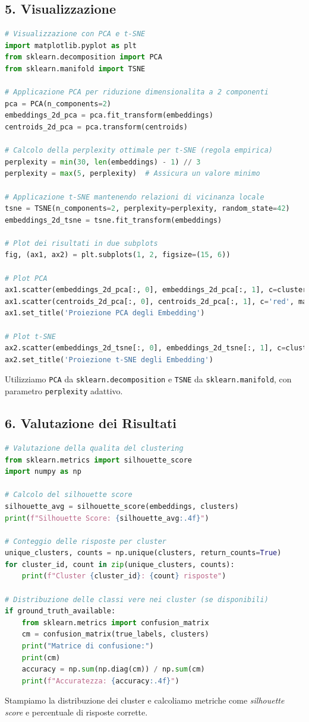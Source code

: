 \documentclass[a4paper,11pt]{article}
\begin{document}
\subsection*{5. Visualizzazione}
\begin{lstlisting}[language=Python]
# Visualizzazione con PCA e t-SNE
import matplotlib.pyplot as plt
from sklearn.decomposition import PCA
from sklearn.manifold import TSNE

# Applicazione PCA per riduzione dimensionalita a 2 componenti
pca = PCA(n_components=2)
embeddings_2d_pca = pca.fit_transform(embeddings)
centroids_2d_pca = pca.transform(centroids)

# Calcolo della perplexity ottimale per t-SNE (regola empirica)
perplexity = min(30, len(embeddings) - 1) // 3
perplexity = max(5, perplexity)  # Assicura un valore minimo

# Applicazione t-SNE mantenendo relazioni di vicinanza locale
tsne = TSNE(n_components=2, perplexity=perplexity, random_state=42)
embeddings_2d_tsne = tsne.fit_transform(embeddings)

# Plot dei risultati in due subplots
fig, (ax1, ax2) = plt.subplots(1, 2, figsize=(15, 6))

# Plot PCA
ax1.scatter(embeddings_2d_pca[:, 0], embeddings_2d_pca[:, 1], c=clusters, cmap='viridis')
ax1.scatter(centroids_2d_pca[:, 0], centroids_2d_pca[:, 1], c='red', marker='X', s=100)
ax1.set_title('Proiezione PCA degli Embedding')

# Plot t-SNE
ax2.scatter(embeddings_2d_tsne[:, 0], embeddings_2d_tsne[:, 1], c=clusters, cmap='viridis')
ax2.set_title('Proiezione t-SNE degli Embedding')
\end{lstlisting}
Utilizziamo \texttt{PCA} da \texttt{sklearn.decomposition} e \texttt{TSNE} da \texttt{sklearn.manifold}, con parametro \texttt{perplexity} adattivo.

\subsection*{6. Valutazione dei Risultati}
\begin{lstlisting}[language=Python]
# Valutazione della qualita del clustering
from sklearn.metrics import silhouette_score
import numpy as np

# Calcolo del silhouette score
silhouette_avg = silhouette_score(embeddings, clusters)
print(f"Silhouette Score: {silhouette_avg:.4f}")

# Conteggio delle risposte per cluster
unique_clusters, counts = np.unique(clusters, return_counts=True)
for cluster_id, count in zip(unique_clusters, counts):
    print(f"Cluster {cluster_id}: {count} risposte")

# Distribuzione delle classi vere nei cluster (se disponibili)
if ground_truth_available:
    from sklearn.metrics import confusion_matrix
    cm = confusion_matrix(true_labels, clusters)
    print("Matrice di confusione:")
    print(cm)
    accuracy = np.sum(np.diag(cm)) / np.sum(cm)
    print(f"Accuratezza: {accuracy:.4f}")
\end{lstlisting}
Stampiamo la distribuzione dei cluster e calcoliamo metriche come \emph{silhouette score} e percentuale di risposte corrette.
\end{document}
